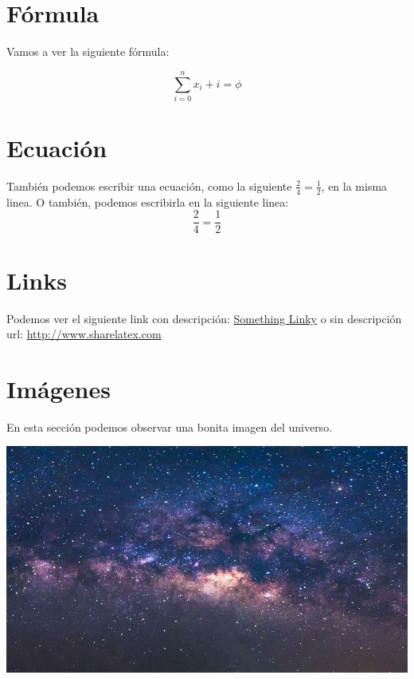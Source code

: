 \documentclass{article}
\begin{document}
\section{Fórmula}
Vamos a ver la siguiente fórmula:

\begin{equation}
\sum_{i=0}^{n} x_i + i = \phi
\end{equation}



\section{Ecuación}

También podemos escribir una ecuación, como la siguiente $\frac{2}{4} = \frac{1}{2}$, en la misma linea. O también, podemos escribirla
en la siguiente linea:
$$\frac{2}{4} = \frac{1}{2}$$

\section{Links}

Podemos ver el siguiente link con descripción: \href{http://www.sharelatex.com}{Something Linky} o sin descripción url: \url{http://www.sharelatex.com}

\section{Imágenes}
En esta sección podemos observar una bonita imagen del universo.

\includegraphics{universo.jpg}
\end{document}

